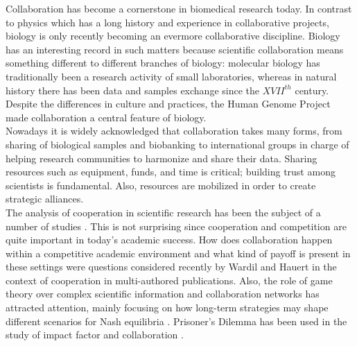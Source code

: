 \documentclass[11pt]{article}
\begin{document}

  

Collaboration has become a cornerstone in biomedical research today.
In contrast to physics which has a long history and experience in
collaborative projects, biology is only recently becoming an evermore
collaborative discipline\cite{Vermeulen2013}. Biology has an
interesting record in such matters because scientific collaboration
means something different to different branches of biology: molecular
biology has traditionally been a research activity of small
laboratories\cite{KnorrCetina1999,Strasser2006}, whereas in natural
history there has been data and samples exchange since the $XVII^{th}$
century\cite{Muller2012,Strasser2012}. Despite the differences in
culture and practices, the Human Genome Project made collaboration a
central feature of biology.\\


Nowadays it is widely acknowledged that collaboration takes many
forms, from sharing of biological samples and biobanking to
international groups in charge of helping research communities to
harmonize and share their data. Sharing resources such as equipment,
funds, and time is critical; building trust among scientists is
fundamental. Also, resources are mobilized in order to create strategic alliances.\\


The analysis of cooperation in scientific research has been the subject of a
number of studies
\cite{Vermeulen2013,Newman2001,Newman2004,Elango2012,HernandezLemus2013,Strasser2006,Strasser2012}. This
is not surprising since cooperation and competition are quite important in
today's academic success. How does collaboration happen within a competitive
academic environment and what kind of payoff is present in these settings were
questions considered recently by Wardil and Hauert \cite{Wardil2015} in the
context of cooperation in multi-authored publications. Also, the role of game
theory over complex scientific information and collaboration networks has
attracted attention, mainly focusing on how long-term strategies may shape
different scenarios for Nash equilibria \cite{hanauske2012}. Prisoner's Dilemma
has been used in the study of impact factor and collaboration
\cite{Hara_etal_2002,Lieberman_etal_2005}. \\  
\end{document}
